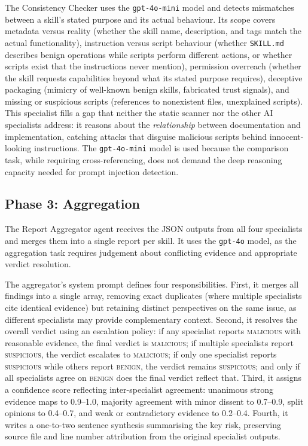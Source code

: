 The Consistency Checker uses the \texttt{gpt-4o-mini} model and detects mismatches between a skill's stated purpose and its actual behaviour. Its scope covers metadata versus reality (whether the skill name, description, and tags match the actual functionality), instruction versus script behaviour (whether \texttt{SKILL.md} describes benign operations while scripts perform different actions, or whether scripts exist that the instructions never mention), permission overreach (whether the skill requests capabilities beyond what its stated purpose requires), deceptive packaging (mimicry of well-known benign skills, fabricated trust signals), and missing or suspicious scripts (references to nonexistent files, unexplained scripts). This specialist fills a gap that neither the static scanner nor the other AI specialists address: it reasons about the \emph{relationship} between documentation and implementation, catching attacks that disguise malicious scripts behind innocent-looking instructions. The \texttt{gpt-4o-mini} model is used because the comparison task, while requiring cross-referencing, does not demand the deep reasoning capacity needed for prompt injection detection.

\subsection{Phase 3: Aggregation}
\label{sec:aggregation}

The Report Aggregator agent receives the JSON outputs from all four specialists and merges them into a single report per skill. It uses the \texttt{gpt-4o} model, as the aggregation task requires judgement about conflicting evidence and appropriate verdict resolution.

The aggregator's system prompt defines four responsibilities. First, it merges all findings into a single array, removing exact duplicates (where multiple specialists cite identical evidence) but retaining distinct perspectives on the same issue, as different specialists may provide complementary context. Second, it resolves the overall verdict using an escalation policy: if any specialist reports \textsc{malicious} with reasonable evidence, the final verdict is \textsc{malicious}; if multiple specialists report \textsc{suspicious}, the verdict escalates to \textsc{malicious}; if only one specialist reports \textsc{suspicious} while others report \textsc{benign}, the verdict remains \textsc{suspicious}; and only if all specialists agree on \textsc{benign} does the final verdict reflect that. Third, it assigns a confidence score reflecting inter-specialist agreement: unanimous strong evidence maps to 0.9--1.0, majority agreement with minor dissent to 0.7--0.9, split opinions to 0.4--0.7, and weak or contradictory evidence to 0.2--0.4. Fourth, it writes a one-to-two sentence synthesis summarising the key risk, preserving source file and line number attribution from the original specialist outputs.

